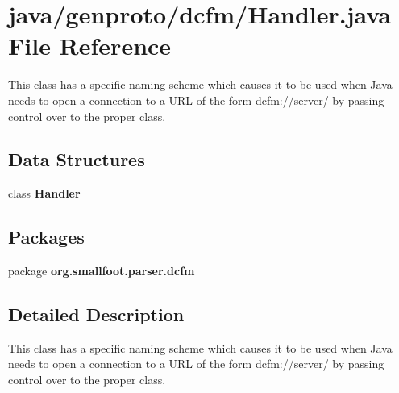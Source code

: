 \section{java/genproto/dcfm/\+Handler.java File Reference}
\label{dcfm_2Handler_8java}


This class has a specific naming scheme which causes it to be used when Java needs to open a connection to a U\+R\+L of the form dcfm\+://server/ by passing control over to the proper class.  


\subsection*{Data Structures}
\begin{DoxyCompactItemize}
\item 
class {\bf Handler}
\end{DoxyCompactItemize}
\subsection*{Packages}
\begin{DoxyCompactItemize}
\item 
package {\bf org.\+smallfoot.\+parser.\+dcfm}
\end{DoxyCompactItemize}


\subsection{Detailed Description}
This class has a specific naming scheme which causes it to be used when Java needs to open a connection to a U\+R\+L of the form dcfm\+://server/ by passing control over to the proper class. 

